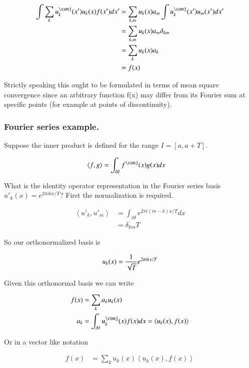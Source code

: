 \documentclass{article}
\newcommand{\Innerprod}[2]{\left\langle{#1}, {#2}\right\rangle}
\begin{document}
\begin{align*}
\int \sum_{k} u_k^\conj(x') u_k(x) f(x') dx'
&=
\sum_{k,m} u_k(x) a_m \int u_k^\conj(x') u_m(x') dx' \\
&=
\sum_{k,m} u_k(x) a_m \delta_{km} \\
&=
\sum_{k} u_k(x) a_k \\
&=
f(x) 
\end{align*}

Strictly speaking this ought to be formulated in terms of mean square convergence since an arbitrary function f(x) 
may differ from its Fourier sum at specific points (for example at points of discontinuity).

\subsubsection{ Fourier series example. }

Suppose the inner product is defined for the range $I = [a, a+T]$.

\begin{align*}
\Innerprod{f}{g} &= \int_{\partial I} f^\conj(x) g(x) dx
\end{align*}

What is the identity operator representation in the Fourier series basis ${u'}_k(x) = e^{ 2 \pi i k x / T}$?  First the 
normalization is required.

\begin{align*}
\Innerprod{{u'}_k}{{u'}_m} 
&= \int_{\partial I} e^{ 2 \pi i (m-k) x /T } dx  \\
&= \delta_{km} T
\end{align*}

So our orthonormalized basis is

\begin{align*}
u_k(x) = \frac{1}{\sqrt{T}} e^{ 2 \pi i k x / T}
\end{align*}

Given this orthonormal basis we can write 

\begin{align*}
f(x) 
&= \sum_k a_k u_k(x) \\
a_k &= \int_{\partial I} u_k^\conj(x) f(x) dx = \Innerprod{u_k(x)}{f(x)} \\
\end{align*}

Or in a vector like notation

\begin{align*}
f(x) &= \sum_k u_k(x) \Innerprod{u_k(x)}{f(x)}
\end{align*}
\end{document}
